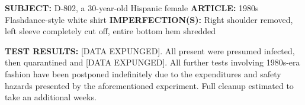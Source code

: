 \begin{leftbar}
\begin{flushleft}
\textbf{SUBJECT:} D-802, a 30-year-old Hispanic female\linebreak
\textbf{ARTICLE:} 1980s Flashdance-style white shirt\linebreak
\textbf{IMPERFECTION(S):} Right shoulder removed, left sleeve completely cut off, entire bottom hem shredded
\end{flushleft}
\textbf{TEST RESULTS:} [DATA EXPUNGED]. All present were presumed infected, then quarantined and [DATA EXPUNGED].
All further tests involving 1980s-era fashion have been postponed indefinitely due to the expenditures and safety hazards presented by the aforementioned experiment. Full cleanup estimated to take an additional  weeks.
\end{leftbar}


